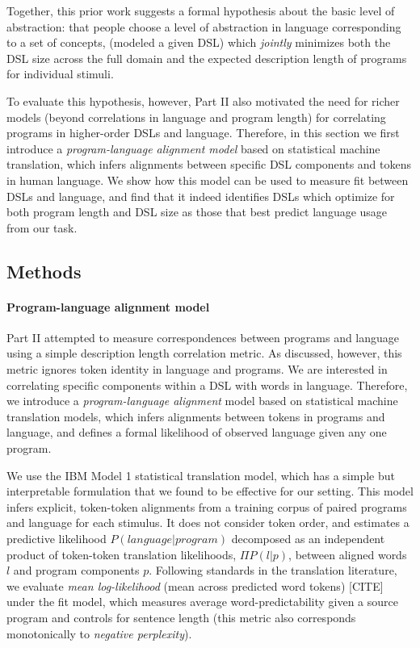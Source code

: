 \documentclass[10pt,letterpaper]{article}
\begin{document}
Together, this prior work suggests a formal hypothesis about the basic level of abstraction: that people choose a level of abstraction in language corresponding to a set of concepts, (modeled a given DSL) which \textit{jointly} minimizes both the DSL size across the full domain and the expected description length of programs for individual stimuli.

To evaluate this hypothesis, however, Part II also motivated the need for richer models (beyond correlations in language and program length) for correlating programs in higher-order DSLs and language. Therefore, in this section we first introduce a \textit{program-language alignment model} based on statistical machine translation, which infers alignments between specific DSL components and tokens in human language. We show how this model can be used to measure fit between DSLs and language, and find that it indeed identifies DSLs which optimize for both program length and DSL size as those that best predict language usage from our task.


\subsection{Methods}
\paragraph{Program-language alignment model}
Part II attempted to measure correspondences between programs and language using a simple description length correlation metric. As discussed, however, this metric ignores token identity in language and programs. We are interested in correlating specific components within a DSL with words in language. Therefore, we introduce a \textit{program-language alignment} model based on statistical machine translation models, which infers alignments between tokens in programs and language, and defines a formal likelihood of observed language given any one program.

We use the IBM Model 1  statistical translation model, which has a simple but interpretable formulation that we found to be effective for our setting. This model infers explicit, token-token alignments from a training corpus of paired programs and language for each stimulus. It does not consider token order, and estimates a predictive likelihood $P(language | program)$ decomposed as an independent product of token-token translation likelihoods, $\Pi P(l | p)$, between aligned words $l$ and program components $p$. Following standards in the translation literature, we evaluate \textit{mean log-likelihood} (mean across predicted word tokens) [CITE] under the fit model, which measures average word-predictability given a source program and controls for sentence length (this metric also corresponds monotonically to \textit{negative perplexity}).
\end{document}
